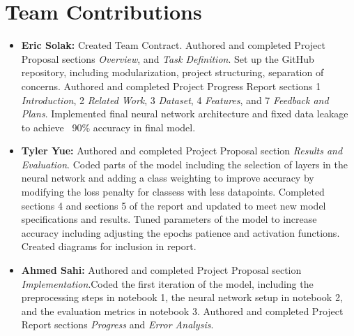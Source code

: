 \documentclass[11pt]{article}
\begin{document}
%


\section*{Team Contributions}
\begin{itemize}
  \item \textbf{Eric Solak: } Created Team Contract. Authored and completed Project Proposal sections \textit{Overview}, and \textit{Task Definition}. Set up the GitHub repository, including modularization, project structuring, separation of concerns. 
  Authored and completed Project Progress Report sections 1 \textit{Introduction}, 2 \textit{Related Work}, 3 \textit{Dataset}, 4 \textit{Features}, and 7 \textit{Feedback and Plans}. Implemented final neural network architecture
  and fixed data leakage to achieve ~90\% accuracy in final model.
  \item \textbf{Tyler Yue: } Authored and completed Project Proposal section \textit{Results and Evaluation}. Coded parts of the model including the selection of layers in the neural network and adding a class weighting to improve accuracy by modifying the loss penalty for classess with less datapoints. Completed sections 4 and sections 5 of the report and updated to meet new model specifications and results. Tuned parameters of the model to increase accuracy including adjusting the epochs patience and activation functions. Created diagrams for inclusion in report. 
  \item \textbf{Ahmed Sahi: } Authored and completed Project Proposal section \textit{Implementation}.Coded the first iteration of the model, including the preprocessing steps in notebook 1, the neural network setup in notebook 2, and the evaluation metrics in notebook 3. Authored and completed Project Report sections \textit{Progress} and \textit{Error Analysis}.
\end{itemize}
%





\end{document}
